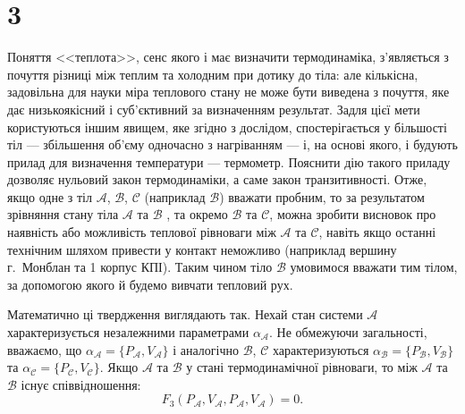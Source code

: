 \begin{figure}\centering
{}
\caption{}\label{pic:ring}
\end{figure}

\section{3}


Поняття <<теплота>>, сенс якого і має визначити термодинаміка, з'являється з почуття різниці між теплим та холодним при дотику до тіла: але кількісна, задовільна для науки міра теплового стану не може бути виведена з почуття, яке дає низькоякісний і суб'єктивний за визначенням результат. Задля цієї мети користуються іншим явищем, яке згідно з дослідом, спостерігається у більшості тіл --- збільшення об'єму одночасно з нагріванням  --- і, на основі якого, і будують прилад для визначення температури --- термометр. Пояснити дію такого приладу дозволяє нульовий закон термодинаміки, а саме закон транзитивності. Отже, якщо одне з тіл $\mathcal{A}$, $\mathcal{B}$, $\mathcal{C}$ (наприклад $\mathcal{B}$) вважати пробним, то за результатом зрівняння стану тіла $\mathcal{A}$ та $\mathcal{B}$ , та окремо $\mathcal{B}$ та $\mathcal{C}$, можна зробити висновок про наявність або можливість теплової рівноваги між $\mathcal{A}$ та $\mathcal{C}$, навіть якщо останні технічним шляхом привести у контакт неможливо (наприклад вершину г.~Монблан та 1 корпус КПІ). Таким чином тіло $\mathcal{B}$ умовимося вважати тим тілом, за допомогою якого й будемо вивчати тепловий рух.

Математично ці твердження виглядають так. Нехай стан системи $\mathcal{A}$
характеризується незалежними параметрами $\alpha_{\mathcal{A}}$.
Не обмежуючи загальності, вважаємо, що
$\alpha_{\mathcal{A}} = \{P_{\mathcal{A}}, V_{\mathcal{A}}\}$ і
аналогічно $\mathcal{B}$, $\mathcal{C}$ характеризуються $\alpha_{\mathcal{B}} = \{P_{\mathcal{B}}, V_{\mathcal{B}}\}$ та $\alpha_{\mathcal{C}} = \{P_{\mathcal{C}}, V_{\mathcal{C}}\}$. Якщо $\mathcal{A}$ та $\mathcal{B}$ у стані термодинамічної рівноваги, то між $\mathcal{A}$ та $\mathcal{B}$ існує співвідношення:
\begin{equation}\label{eq:F3}
    F_3 (P_{\mathcal{A}}, V_{\mathcal{A}}, P_{\mathcal{A}},V_{\mathcal{A}}) = 0.
\end{equation}

